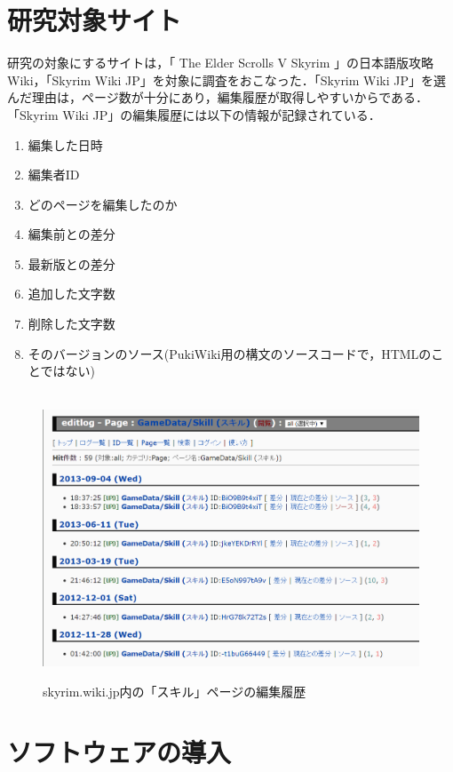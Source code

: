 \section{研究対象サイト}

研究の対象にするサイトは，「 The Elder Scrolls V Skyrim 」の日本語版攻略Wiki，「Skyrim Wiki JP」\cite{skyrimwiki}を対象に調査をおこなった．「Skyrim Wiki JP」を選んだ理由は，ページ数が十分にあり，編集履歴が取得しやすいからである．\\
「Skyrim Wiki JP」の編集履歴には以下の情報が記録されている．

\begin{enumerate}
\item 編集した日時
\item 編集者ID
\item どのページを編集したのか
\item 編集前との差分
\item 最新版との差分
\item 追加した文字数
\item 削除した文字数
\item そのバージョンのソース(PukiWiki用の構文のソースコードで，HTMLのことではない)
\end{enumerate}

\begin{figure}[htbp]
\centering　
\includegraphics[width=13cm]{skyrimrireki.png}
\caption{skyrim.wiki.jp内の「スキル」ページの編集履歴}
\end{figure}

\newpage


\section{ソフトウェアの導入}

